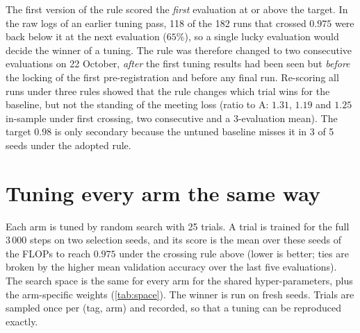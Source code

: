 \begin{protocolbox}[title={A post-hoc protocol decision, stated openly}]
The first version of the rule scored the \emph{first} evaluation at or above the target. In the raw logs of an earlier tuning pass, 118 of the 182 runs that crossed $0.975$ were back below it at the next evaluation ($65\%$), so a single lucky evaluation would decide the winner of a tuning. The rule was therefore changed to two consecutive evaluations on 22 October, \emph{after} the first tuning results had been seen but \emph{before} the locking of the first pre-registration and before any final run. Re-scoring all runs under three rules showed that the rule changes which trial wins for the baseline, but not the standing of the meeting loss (ratio to A: $1.31$, $1.19$ and $1.25$ in-sample under first crossing, two consecutive and a 3-evaluation mean). The target $0.98$ is only secondary because the untuned baseline misses it in 3 of 5 seeds under the adopted rule.
\end{protocolbox}

\section{Tuning every arm the same way}\label{sec:tuning}
Each arm is tuned by random search with 25 trials. A trial is trained for the full 3\,000 steps on two selection seeds, and its score is the mean over these seeds of the FLOPs to reach $0.975$ under the crossing rule above (lower is better; ties are broken by the higher mean validation accuracy over the last five evaluations). The search space is the same for every arm for the shared hyper-parameters, plus the arm-specific weights (\cref{tab:space}). The winner is run on fresh seeds. Trials are sampled once per (tag, arm) and recorded, so that a tuning can be reproduced exactly.

